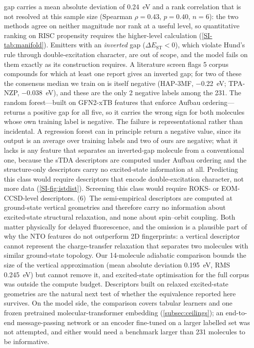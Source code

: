 gap carries a mean absolute deviation of \qty{0.24}{\electronvolt} and a rank
correlation that is not resolved at this sample size (Spearman $\rho = 0.43$,
$p = 0.40$, $n = 6$): the two methods agree on neither magnitude nor rank at a useful
level, so quantitative ranking on RISC propensity requires the higher-level calculation
(\cref{SI-tab:manifold}). Emitters with an \emph{inverted} gap ($\Delta E_\text{ST}<0$), which violate
Hund's rule through double-excitation character,\cite{Veglianti2025} are out of
scope, and the model fails on them exactly as its construction requires. A literature
screen flags \num{5} corpus compounds for which at least one report gives an inverted
gap; for two of these the consensus median we train on is itself negative
(HAP-3MF, \qty{-0.22}{\electronvolt}; TPA-NZP, \qty{-0.038}{\electronvolt}), and these
are the only \num{2} negative labels among the \num{231}. The random forest---built on
GFN2-xTB features that enforce Aufbau ordering---returns a positive gap for all five, so
it carries the wrong sign for both molecules whose own training label is negative. The failure is representational rather than incidental. A regression forest can in
principle return a negative value, since its output is an average over training labels and
two of ours are negative; what it lacks is any feature that separates an inverted-gap
molecule from a conventional one, because the sTDA descriptors are computed under Aufbau
ordering and the structure-only descriptors carry no excited-state information at all.
Predicting this class would require descriptors that encode double-excitation character,
not more data (\cref{SI-fig:istdist}). Screening this
class would require ROKS- or EOM-CCSD-level descriptors.\cite{Salvi2025}
(6)~The semi-empirical descriptors are computed at ground-state vertical geometries and
therefore carry no information about excited-state structural relaxation, and none about
spin--orbit coupling. Both matter physically for delayed fluorescence, and the omission is
a plausible part of why the NTO features do not outperform 2D fingerprints: a vertical
descriptor cannot represent the charge-transfer relaxation that separates two molecules with
similar ground-state topology. Our \num{14}-molecule adiabatic comparison bounds the size of
the vertical approximation (mean absolute deviation \qty{0.195}{\electronvolt}, RMS
\qty{0.245}{\electronvolt}) but cannot remove it, and excited-state optimisation for the
full corpus was outside the compute budget. Descriptors built on relaxed excited-state
geometries are the natural next test of whether the equivalence reported here survives.
On the model side, the comparison covers tabular learners and one frozen pretrained
molecular-transformer embedding (\cref{subsec:ceilings}); an end-to-end message-passing
network or an encoder fine-tuned on a larger labelled set was not attempted, and either
would need a benchmark larger than \num{231} molecules to be informative.

